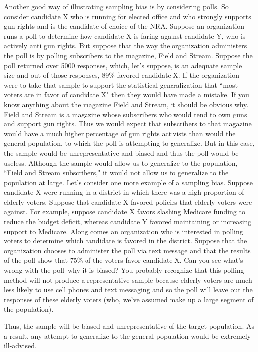 Another good way of illustrating sampling bias is by considering polls. So
consider candidate X who is running for elected office and who strongly
supports gun rights and is the candidate of choice of the NRA. Suppose an
organization runs a poll to determine how candidate X is faring against
candidate Y, who is actively anti gun rights. But suppose that the way the
organization administers the poll is by polling subscribers to the magazine, Field
and Stream. Suppose the poll returned over 5000 responses, which, let's
suppose, is an adequate sample size and out of those responses, 89\% 
favored
candidate X. If the organization were to take that sample to support the
statistical generalization that ``most voters are in favor of candidate X" then they
would have made a mistake. If you know anything about the magazine Field
and Stream, it should be obvious why. Field and Stream is a magazine whose
subscribers who would tend to own guns and support gun rights. Thus we
would expect that subscribers to that magazine would have a much higher
percentage of gun rights activists than would the general population, to which
the poll is attempting to generalize. But in this case, the sample would be
unrepresentative and biased and thus the poll would be useless. Although the
sample would allow us to generalize to the population, ``Field and Stream
subscribers," it would not allow us to generalize to the population at large.
Let's consider one more example of a sampling bias. Suppose candidate X
were running in a district in which there was a high proportion of elderly voters.
Suppose that candidate X favored policies that elderly voters were against. For
example, suppose candidate X favors slashing Medicare funding to reduce the
budget deficit, whereas candidate Y favored maintaining or increasing support
to Medicare. Along comes an organization who is interested in polling voters to
determine which candidate is favored in the district. Suppose that the
organization chooses to administer the poll via text message and that the results
of the poll show that 75\% 
of the voters favor candidate X. Can you see what's
wrong with the poll--why it is biased? You probably recognize that this polling
method will not produce a representative sample because elderly voters are
much less likely to use cell phones and text messaging and so the poll will leave
out the responses of these elderly voters (who, we've assumed make up a large
segment of the population).

Thus, the sample will be biased and
unrepresentative of the target population. As a result, any attempt to generalize
to the general population would be extremely ill-advised. \\

